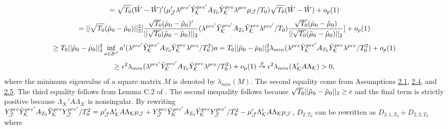 \documentclass{article}
\begin{document}
\begin{equation*}
    = \sqrt{T_0}(\Tilde{W} - \hat{W})' (\mu_{\mathcal{J}}'\lambda^{pre'} \Tilde{Y}_{\mathcal{K}}^{pre'} A_{T_{0}} \Tilde{Y}_{\mathcal{K}}^{pre} \lambda^{pre} \mu_{\mathcal{J}} /T_0) \sqrt{T_0}(\Tilde{W} - \hat{W}) + o_p(1)
\end{equation*}
\begin{equation*}
    = ||\sqrt{T_0}(\Tilde{\mu}_0 - \hat{\mu}_0)||_2^2 [\frac{\sqrt{T_0}(\Tilde{\mu}_0 - \hat{\mu}_0)'}{||\sqrt{T_0}(\Tilde{\mu}_0 - \hat{\mu}_0)||_2} (\lambda^{pre'} \Tilde{Y}_{\mathcal{K}}^{pre'} A_{T_{0}} \Tilde{Y}_{\mathcal{K}}^{pre} \lambda^{pre'}/T_0) \frac{\sqrt{T_0}(\Tilde{\mu}_0 - \hat{\mu}_0)}{||\sqrt{T_0}(\Tilde{\mu}_0 - \hat{\mu}_0)||_2}] + o_p(1)
\end{equation*}
\begin{equation*}
    \geq T_0 ||\Tilde{\mu}_0 - \hat{\mu}_0||_2^2 \inf_{a \in \mathcal{S}^J} a'(\lambda^{pre'} \Tilde{Y}_{\mathcal{K}}^{pre'} A_{T_{0}} \Tilde{Y}_{\mathcal{K}}^{pre} \lambda^{pre}/T_0^2)a = T_0 ||\Tilde{\mu}_0 - \hat{\mu}_0||_2^2 \lambda_{min} (\lambda^{pre}\Tilde{Y}_{\mathcal{K}}^{pre'} A_{T_{0}} \Tilde{Y}_{\mathcal{K}}^{pre} \lambda^{pre}/T_0^2) + o_p(1)
\end{equation*}
\begin{equation*}
    \geq \epsilon^2 \lambda_{min} (\lambda^{pre'}\Tilde{Y}_{\mathcal{K}}^{pre'} A_{T_{0}} \Tilde{Y}_{\mathcal{K}}^{pre} \lambda^{pre}/T_0^2) + o_p(1) \overset{p}{\rightarrow} \epsilon^2 \lambda_{min}( \Lambda_{\mathcal{K}}'  A \Lambda_{\mathcal{K}} ) > 0,
\end{equation*}
where the minimum eigenvalue of a square matrix $M$ is denoted by $\lambda_{min} (M)$. The second equality come from Assumptions \hyperref[A2]{2.1}, \hyperref[A2]{2.4}, and \hyperref[A2]{2.5}. The third equality follows from Lemma C.2 of \cite{Li2020}. The second inequality follows because $\sqrt{T_0}||\Tilde{\mu}_0 - \hat{\mu}_0||_2 \geq \epsilon$ and the final term is strictly positive because $\Lambda_{\mathcal{K}}'  A \Lambda_{\mathcal{K}}$ is nonsingular. By rewriting $Y_{\mathcal{J}}^{pre} \Tilde{Y}_{\mathcal{K}}^{pre'} A_{T_{0}} \Tilde{Y}_{\mathcal{K}}^{pre} Y_{\mathcal{J}}^{pre'}/T_0^2 = \mu_{\mathcal{J}}'\Lambda_{\mathcal{K}}' A \Lambda_{\mathcal{K}} \mu_{\mathcal{J}} + Y_{\mathcal{J}}^{pre} \Tilde{Y}_{\mathcal{K}}^{pre'} A_{T_{0}} \Tilde{Y}_{\mathcal{K}}^{pre} Y_{\mathcal{J}}^{pre'}/T_0^2 - \mu_{\mathcal{J}}' \Lambda_{\mathcal{K}}' A \Lambda_{\mathcal{K}} \mu_{\mathcal{J}}$, $D_{2,T_0}$ can be rewritten as $D_{2,1,T_0} + D_{2,2,T_0}$ where
\end{document}
